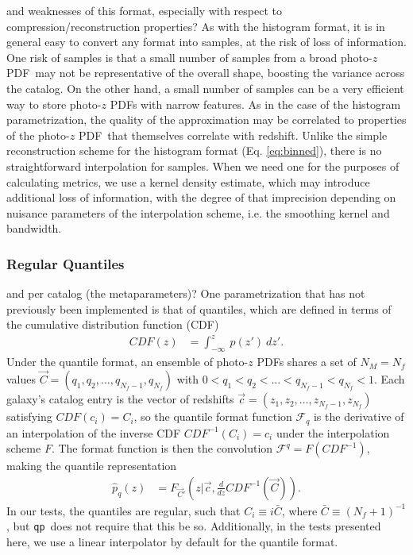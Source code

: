 \documentclass[\docopts]{\docclass}
\newcommand{\qp}{\texttt{qp}}
\newcommand{\pz}{photo-$z$ PDF}
\begin{document}
and weaknesses of this format, especially with respect to 
compression/reconstruction properties?
As with the histogram format, it is in general easy to convert any format into 
samples, at the risk of loss of information.  One risk of samples is that a 
small number of samples from a broad \pz\ may not be representative of the 
overall shape, boosting the variance across the catalog.  On the other hand, a 
small number of samples can be a very efficient way to store \pz s with narrow 
features.  As in the case of the histogram parametrization, the quality of the 
approximation may be correlated to properties of the \pz\ that themselves 
correlate with redshift.  Unlike the simple reconstruction scheme for the 
histogram format (Eq. \ref{eq:binned}), there is no straightforward 
interpolation for samples.  When we need one for the purposes of calculating 
metrics, we use a kernel density estimate, which may introduce additional loss 
of information, with the degree of that imprecision depending on nuisance 
parameters of the interpolation scheme, i.e. the smoothing kernel and bandwidth.

\subsubsection{Regular Quantiles}
\label{sec:quantiles}

and per catalog (the metaparameters)?
One parametrization that has not previously been implemented is that of 
quantiles, which are defined in terms of the cumulative distribution function 
(CDF)
\begin{align}
  \label{eq:cdf}
  CDF(z) &= \int_{-\infty}^{z}\ p(z')\ dz'.
\end{align}
Under the quantile format, an ensemble of \pz s shares a set of $N_{M}=N_{f}$ 
values $\vec{C}=(q_{1}, q_{2}, \dots, q_{N_{f}-1}, q_{N_{f}})$ with 
$0<q_{1}<q_{2}<\dots<q_{N_{f}-1}<q_{N_{f}}<1$.  Each galaxy's catalog entry is 
the vector of redshifts $\vec{c}=(z_{1}, z_{2}, \dots, z_{N_{f}-1}, z_{N_{f}})$ 
satisfying $CDF(c_{i})=C_{i}$, so the quantile format function 
$\mathcal{F}_{q}$ is the derivative of an interpolation of the inverse CDF 
$CDF^{-1}(C_{i})=c_{i}$ under the interpolation scheme $F$.  The format 
function is then the convolution $\mathcal{F}^{q}=F(CDF^{-1})$, making the 
quantile representation
\begin{align}
  \label{eq:quantiles}
  \hat{p}_{q}(z) &= F_{\vec{C}'}(z| \vec{c}, \frac{d}{dz}CDF^{-1}(\vec{C})).
\end{align}
In our tests, the quantiles are regular, such that $C_{i}\equiv i\bar{C}$, 
where $\bar{C}\equiv(N_{f}+1)^{-1}$, but \qp\ does not require that this be so. 
 Additionally, in the tests presented here, we use a linear interpolator by 
default for the quantile format.
\end{document}
